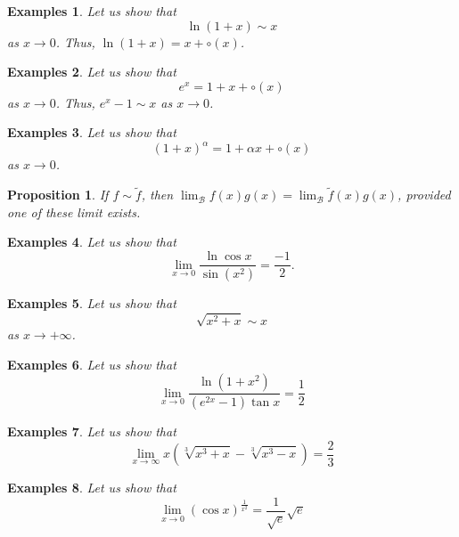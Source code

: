 \documentclass[a4paper,12pt]{article} %
\newtheorem{proposition}{Proposition}[section]
\newtheorem{example}{Examples}
\begin{document}
\begin{example}
    Let us show that 
    \[
        \ln (1+x) \sim x 
        \]
    as $x \to 0$.
    Thus, $\displaystyle \ln (1+x) = x + \circ(x)$.
\end{example}

\begin{example}
    Let us show that 
    \[
        e^x = 1 + x + \circ(x)
        \]
    as $x \to 0$.
    Thus, $e^x - 1 \sim x$ as $x \to 0$.
\end{example}

\begin{example}
    Let us show that 
    \[
        \left(1+x\right)^{\alpha} = 1 + \alpha x + \circ(x)
        \]
    as $x \to 0$.
\end{example}

\begin{proposition}
    If $f \sim \tilde{f}$, then $ \displaystyle \lim_{\mathcal{B}}f(x)g(x) = \lim_{\mathcal{B}} \tilde{f}(x)g(x)$,
    provided one of these limit exists.
\end{proposition}

\begin{example}
    Let us show that 
    \[
        \lim_{x \to 0} \frac{\ln \cos x}{\sin \left(x^2\right)} = \frac{-1}{2}.
        \]
\end{example}

\begin{example}
    Let us show that 
    \[
        \sqrt{x^2 + x} \sim x
        \]
    as $x \to +\infty$.
\end{example}

\begin{example}
    Let us show that 
    \[
        \lim_{x \to 0}\frac{\ln \left(1+x^2\right)}{\left(e^{2x} -1\right)\tan x}  = \frac{1}{2}
        \]
\end{example}

\begin{example}
    Let us show that 
    \[
        \lim_{x \to \infty} x\left(\sqrt[3]{x^3 + x} - \sqrt[3]{x^3 - x}\right) = \frac{2}{3}
        \]
\end{example}

\begin{example}
    Let us show that 
    \[
        \lim_{x \to 0}\left(\cos x\right)^{\frac{1}{x^2}} = \frac{1}{\sqrt{e}}{\sqrt{e}}
        \]
\end{example}
\end{document}

